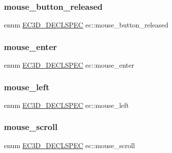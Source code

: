 \subsubsection{\texorpdfstring{mouse\+\_\+button\+\_\+released}{mouse\_button\_released}}
{\footnotesize\ttfamily enum \mbox{\hyperlink{_common_8h_aac42573e202ca3dd4d259c81691e2369}{E\+C3\+D\+\_\+\+D\+E\+C\+L\+S\+P\+EC}} ec\+::mouse\+\_\+button\+\_\+released\hspace{0.3cm}{\ttfamily [strong]}}

\mbox{\label{namespaceec_a7b76ba0c0ae46329abe1fc22115ab729}} 
\subsubsection{\texorpdfstring{mouse\+\_\+enter}{mouse\_enter}}
{\footnotesize\ttfamily enum \mbox{\hyperlink{_common_8h_aac42573e202ca3dd4d259c81691e2369}{E\+C3\+D\+\_\+\+D\+E\+C\+L\+S\+P\+EC}} ec\+::mouse\+\_\+enter\hspace{0.3cm}{\ttfamily [strong]}}

\mbox{\label{namespaceec_a5fd84b2204156e6d2e500dfd83ea2b4b}} 
\subsubsection{\texorpdfstring{mouse\+\_\+left}{mouse\_left}}
{\footnotesize\ttfamily enum \mbox{\hyperlink{_common_8h_aac42573e202ca3dd4d259c81691e2369}{E\+C3\+D\+\_\+\+D\+E\+C\+L\+S\+P\+EC}} ec\+::mouse\+\_\+left\hspace{0.3cm}{\ttfamily [strong]}}

\mbox{\label{namespaceec_a7fb336f49377247955ebd3f6658ba50b}} 
\subsubsection{\texorpdfstring{mouse\+\_\+scroll}{mouse\_scroll}}
{\footnotesize\ttfamily enum \mbox{\hyperlink{_common_8h_aac42573e202ca3dd4d259c81691e2369}{E\+C3\+D\+\_\+\+D\+E\+C\+L\+S\+P\+EC}} ec\+::mouse\+\_\+scroll\hspace{0.3cm}{\ttfamily [strong]}}

